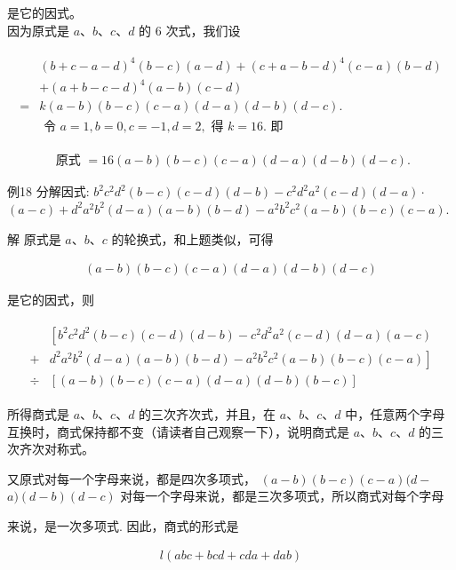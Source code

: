 \documentclass[10pt]{article}
\begin{document}
是它的因式。\\
因为原式是 $a 、 b 、 c 、 d$ 的 6 次式，我们设

\begin{align*}
\begin{aligned}
& (b+c-a-d)^{4}(b-c)(a-d)+(c+a-b-d)^{4}(c-a)(b-d) \\
& +(a+b-c-d)^{4}(a-b)(c-d) \\
= & k(a-b)(b-c)(c-a)(d-a)(d-b)(d-c) . \\
& \text { 令 } a=1, b=0, c=-1, d=2, \text { 得 } k=16 . \text { 即 }
\end{aligned}
\end{align*}

\begin{align*}
\text { 原式 }=16(a-b)(b-c)(c-a)(d-a)(d-b)(d-c) .
\end{align*}

例18 分解因式: $b^{2} c^{2} d^{2}(b-c)(c-d)(d-b)-c^{2} d^{2} a^{2}(c-d)(d-a) \cdot$ $(a-c)+d^{2} a^{2} b^{2}(d-a)(a-b)(b-d)-a^{2} b^{2} c^{2}(a-b)(b-c)(c-a)$.

解 原式是 $a 、 b 、 c$ 的轮换式，和上题类似，可得

\begin{align*}
(a-b)(b-c)(c-a)(d-a)(d-b)(d-c)
\end{align*}

是它的因式，则

\begin{align*}
\begin{aligned}
& {\left[b^{2} c^{2} d^{2}(b-c)(c-d)(d-b)-c^{2} d^{2} a^{2}(c-d)(d-a)(a-c)\right.} \\
+ & \left.d^{2} a^{2} b^{2}(d-a)(a-b)(b-d)-a^{2} b^{2} c^{2}(a-b)(b-c)(c-a)\right] \\
\div & {[(a-b)(b-c)(c-a)(d-a)(d-b)(b-c)] }
\end{aligned}
\end{align*}

所得商式是 $a 、 b 、 c 、 d$ 的三次齐次式，并且，在 $a 、 b 、 c 、 d$ 中，任意两个字母互换时，商式保持都不变（请读者自己观察一下），说明商式是 $a 、 b 、 c 、 d$ 的三次齐次对称式。

又原式对每一个字母来说，都是四次多项式， $(a-b)(b-c)(c-a)(d-$ $a)(d-b)(d-c)$ 对每一个字母来说，都是三次多项式，所以商式对每个字母

来说，是一次多项式. 因此，商式的形式是

\begin{align*}
l(a b c+b c d+c d a+d a b)
\end{align*}
\end{document}
